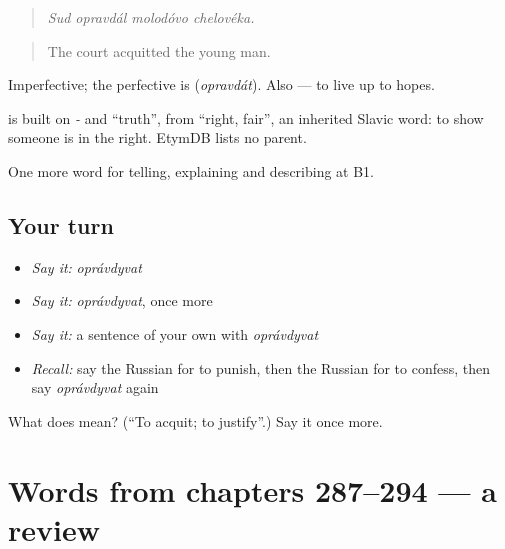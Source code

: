 \begin{quote}
\emph{Sud opravdál molodóvo chelovéka.}
\end{quote}

\begin{quote}
The court acquitted the young man.
\end{quote}

Imperfective; the perfective is \emph{} (\emph{opravdát}). Also \emph{ } — to live up to hopes.

\begin{cousinweb}
\emph{} is built on \emph{-} and \emph{} \textquotedblleft{}truth\textquotedblright{}, from \emph{} \textquotedblleft{}right, fair\textquotedblright{}, an inherited Slavic word: to show someone is in the right. EtymDB lists no parent.
\end{cousinweb}

\begin{grammarlens}[title={What you've built}]
One more word for telling, explaining and describing at B1.
\end{grammarlens}

\subsection*{Your turn}
\begin{itemize}
\raggedright
  \item \emph{Say it:} \emph{oprávdyvat}
  \item \emph{Say it:} \emph{oprávdyvat}, once more
  \item \emph{Say it:} a sentence of your own with \emph{oprávdyvat}
  \item \emph{Recall:} say the Russian for to punish, then the Russian for to confess, then say \emph{oprávdyvat} again
\end{itemize}

\begin{tcolorbox}[breakable,colback=teal!4,colframe=teal!35!black,title={Before you move on}]
What does  mean? (\textquotedblleft{}To acquit; to justify\textquotedblright{}.) Say it once more.
\end{tcolorbox}
\section[(dialogue)]{Words from chapters 287–294 — a review}

\label{lesson:RU-R294-review-287-294}



